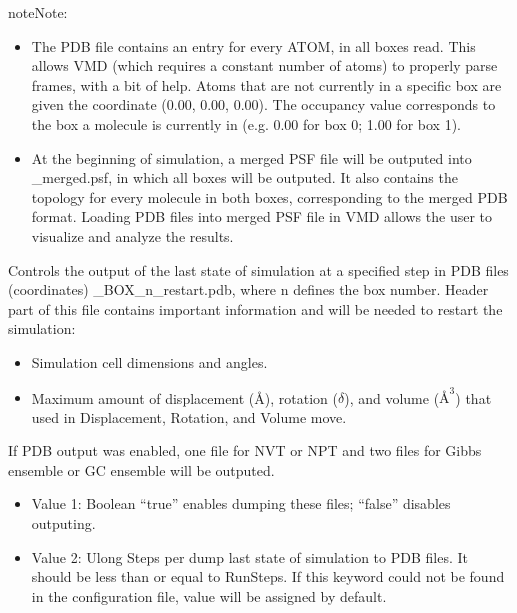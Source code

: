 \documentclass[letterpaper,10pt,english]{sphinxmanual}
\begin{document}
\begin{description}
\begin{itemize}
\end{itemize}

\begin{sphinxadmonition}{note}{Note:}\begin{itemize}
\item {} 
The PDB file contains an entry for every ATOM, in all boxes read. This allows VMD (which requires a
constant number of atoms) to properly parse frames, with a bit of help. Atoms that are not currently
in a specific box are given the coordinate (0.00, 0.00, 0.00). The occupancy value corresponds to the
box a molecule is currently in (e.g. 0.00 for box 0; 1.00 for box 1).

\item {} 
At the beginning of simulation, a merged PSF file will be outputed into \_merged.psf,
in which all boxes will be outputed. It also contains the topology for every molecule in both boxes,
corresponding to the merged PDB format. Loading PDB files into merged PSF file in VMD allows the user
to visualize and analyze the results.

\end{itemize}
\end{sphinxadmonition}

\item[{\sphinxcode{\sphinxupquote{RestartFreq}}}] \leavevmode
Controls the output of the last state of simulation at a specified step in PDB files (coordinates)
\_BOX\_n\_restart.pdb, where n defines the box number. Header part of this file contains
important information and will be needed to restart the simulation:
\begin{itemize}
\item {} 
Simulation cell dimensions and angles.

\item {} 
Maximum amount of displacement (Å), rotation (\(\delta\)), and volume (\(Å^3\)) that used in Displacement, Rotation, and Volume move.

\end{itemize}

If PDB output was enabled, one file for NVT or NPT and two files for Gibbs ensemble or GC ensemble will be outputed.
\begin{itemize}
\item {} 
Value 1: Boolean \sphinxhyphen{} “true” enables dumping these files; “false” disables outputing.

\item {} 
Value 2: Ulong \sphinxhyphen{} Steps per dump last state of simulation to PDB files. It should be less than or equal to RunSteps. If this keyword could not be found in the configuration file,  value will be assigned by default.


\end{itemize}
\end{description}
\end{document}
